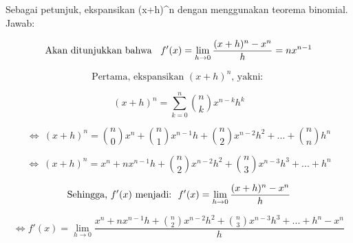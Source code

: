\documentclass{article}
\begin{document}
\begin{eulernotebook}
\begin{eulercomment}
\begin{eulercomment}
\begin{eulercomment}
Sebagai petunjuk, ekspansikan (x+h)\textasciicircum{}n dengan menggunakan teorema
binomial.\\
Jawab:\\
\end{eulercomment}
\begin{eulerformula}
\[
\text{Akan ditunjukkan bahwa \: $f'(x)=\lim_{h\to 0} \frac{(x+h)^n-x^n}{h}=nx^{n-1}$}
\]
\end{eulerformula}
\begin{eulercomment}
\end{eulercomment}
\begin{eulerformula}
\[
\text{Pertama, ekspansikan $(x+h)^n$, yakni: }
\]
\end{eulerformula}
\begin{eulercomment}
\end{eulercomment}
\begin{eulerformula}
\[
\text{$(x+h)^n=\sum_{k=0}^{n} \binom{n}{k}x^{n-k}h^k$}
\]
\end{eulerformula}
\begin{eulercomment}
\end{eulercomment}
\begin{eulerformula}
\[
\text{$\Leftrightarrow \: (x+h)^n=\binom{n}{0}x^{n}+\binom{n}{1}x^{n-1}h+\binom{n}{2}x^{n-2}h^2+ ...+\binom{n}{n}h^n$}
\]
\end{eulerformula}
\begin{eulercomment}
\end{eulercomment}
\begin{eulerformula}
\[
\text{$\Leftrightarrow \: (x+h)^n=x^{n}+nx^{n-1}h+\binom{n}{2}x^{n-2}h^2+\binom{n}{3}x^{n-3}h^3+ ...+h^n$}
\]
\end{eulerformula}
\begin{eulercomment}
\end{eulercomment}
\begin{eulerformula}
\[
\text{Sehingga, $f'(x)$ menjadi:\: $f'(x)=\lim_{h\to 0} \frac{(x+h)^n-x^n}{h}$}
\]
\end{eulerformula}
\begin{eulercomment}
\end{eulercomment}
\begin{eulerformula}
\[
\text{$\Leftrightarrow f'(x)=\lim_{h\to 0} \frac{x^{n}+nx^{n-1}h+\binom{n}{2}x^{n-2}h^2+\binom{n}{3}x^{n-3}h^3+ ...+h^n-x^n}{h}$}
\]
\end{eulerformula}
\begin{eulercomment}
\end{eulercomment}
\begin{eulerformula}

\end{eulerformula}
\end{eulercomment}
\end{eulercomment}
\end{eulernotebook}
\end{document}
